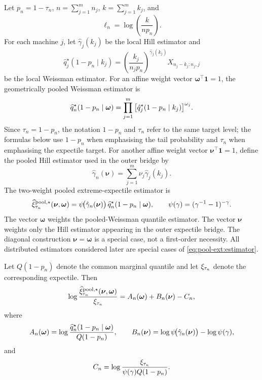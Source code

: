 Let \(p_n=1-\tau_n\), \(n=\sum_{j=1}^{m}n_j\), \(k=\sum_{j=1}^{m}k_j\), and
\[
  \ell_n=\log\!\left(\frac{k}{np_n}\right).
\]
For each machine \(j\), let \(\hat\gamma_j(k_j)\) be the local Hill estimator
and
\[
  \hat q_j^\star(1-p_n\mid k_j)
  =
  \left(\frac{k_j}{n_jp_n}\right)^{\hat\gamma_j(k_j)}
  X_{n_j-k_j:n_j,j}
\]
be the local Weissman estimator. For an affine weight vector
\(\bm\omega^\top\bm 1=1\), the geometrically pooled Weissman estimator is
\[
  \widehat{q}^{\star}_n(1-p_n\mid\bm\omega)
  =
  \prod_{j=1}^{m}
	  \big[\hat q_j^\star(1-p_n\mid k_j)\big]^{\omega_j}.
\]
Since \(\tau_n=1-p_n\), the notation \(1-p_n\) and \(\tau_n\) refer to the same
target level; the formulas below use \(1-p_n\) when emphasising the tail
probability and \(\tau_n\) when emphasising the expectile target.
For another affine weight vector \(\bm\nu^\top\bm 1=1\), define the pooled
Hill estimator used in the outer bridge by
\[
  \hat\gamma_n(\bm\nu)
  =
  \sum_{j=1}^{m}\nu_j\hat\gamma_j(k_j).
\]
The two-weight pooled extreme-expectile estimator is
\begin{equation}
\label{eq:pool-ext:estimator}
  \widehat\xi_{\tau_n}^{\mathrm{pool},\star}(\bm\nu,\bm\omega)
  =
  \psi\!\big(\hat\gamma_n(\bm\nu)\big)\,
  \widehat{q}^{\star}_n(1-p_n\mid\bm\omega),
  \qquad
  \psi(\gamma)=(\gamma^{-1}-1)^{-\gamma}.
\end{equation}
The vector \(\bm\omega\) weights the pooled-Weissman quantile estimator. The
vector \(\bm\nu\) weights only the Hill estimator appearing in the outer
expectile bridge. The diagonal construction
\(\bm\nu=\bm\omega\) is a special case, not a first-order necessity.
All distributed estimators considered later are special cases of
\eqref{eq:pool-ext:estimator}.

\begin{lemma}
\label{lem:pool-ext:decomposition}
Let \(Q(1-p_n)\) denote the common marginal quantile and let
\(\xi_{\tau_n}\) denote the corresponding expectile. Then
\begin{equation}
\label{eq:pool-ext:decomposition}
  \log
  \frac{
    \widehat\xi_{\tau_n}^{\mathrm{pool},\star}(\bm\nu,\bm\omega)
  }{\xi_{\tau_n}}
  =
  A_n(\bm\omega)+B_n(\bm\nu)-C_n,
\end{equation}
where
\[
  A_n(\bm\omega)
  =
  \log\frac{\widehat{q}^{\star}_n(1-p_n\mid\bm\omega)}{Q(1-p_n)},
  \qquad
  B_n(\bm\nu)
  =
  \log\psi\!\big(\hat\gamma_n(\bm\nu)\big)-\log\psi(\gamma),
\]
and
\[
  C_n
  =
  \log
  \frac{\xi_{\tau_n}}{\psi(\gamma)Q(1-p_n)}.
\]
\end{lemma}

